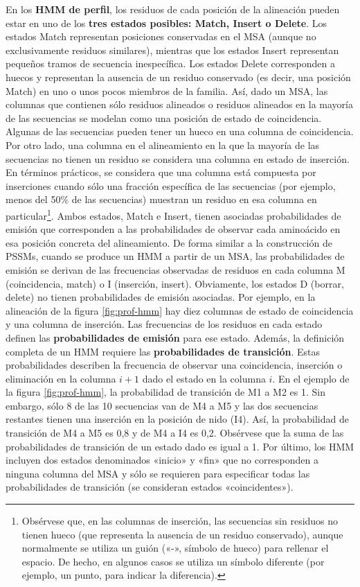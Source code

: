 En los \textbf{HMM de perfil}, los residuos de cada posición de la alineación pueden estar en uno de los \textbf{tres estados posibles: Match, Insert o Delete}. Los estados Match representan posiciones conservadas en el MSA (aunque no exclusivamente residuos similares), mientras que los estados Insert representan pequeños tramos de secuencia inespecífica. Los estados Delete corresponden a huecos y representan la ausencia de un residuo conservado (es decir, una posición Match) en uno o unos pocos miembros de la familia. Así, dado un MSA, las columnas que contienen sólo residuos alineados o residuos alineados en la mayoría de las secuencias se modelan como una posición de estado de coincidencia. Algunas de las secuencias pueden tener un hueco en una columna de coincidencia. Por otro lado, una columna en el alineamiento en la que la mayoría de las secuencias no tienen un residuo se considera una columna en estado de inserción. En términos prácticos, se considera que una columna está compuesta por inserciones cuando sólo una fracción específica de las secuencias (por ejemplo, menos del 50\% de las secuencias) muestran un residuo en esa columna en particular\footnote{Obsérvese que, en las columnas de inserción, las secuencias sin residuos no tienen hueco (que representa la ausencia de un residuo conservado), aunque normalmente se utiliza un guión («-», símbolo de hueco) para rellenar el espacio. De hecho, en algunos casos se utiliza un símbolo diferente (por ejemplo, un punto, para indicar la diferencia).}. Ambos estados, Match e Insert, tienen asociadas probabilidades de emisión que corresponden a las probabilidades de observar cada aminoácido en esa posición concreta del alineamiento. De forma similar a la construcción de PSSMs, cuando se produce un HMM a partir de un MSA, las probabilidades de emisión se derivan de las frecuencias observadas de residuos en cada columna M (coincidencia, match) o I (inserción, insert). Obviamente, los estados D (borrar, delete) no tienen probabilidades de emisión asociadas. Por ejemplo, en la alineación de la figura \ref{fig:prof-hmm} hay diez columnas de estado de coincidencia y una columna de inserción. Las frecuencias de los residuos en cada estado definen las \textbf{probabilidades de emisión} para ese estado. Además, la definición completa de un HMM requiere las \textbf{probabilidades de transición}. Estas probabilidades describen la frecuencia de observar una coincidencia, inserción o eliminación en la columna $i + 1$ dado el estado en la columna $i$. En el ejemplo de la figura \ref{fig:prof-hmm}, la probabilidad de transición de M1 a M2 es 1. Sin embargo, sólo 8 de las 10 secuencias van de M4 a M5 y las dos secuencias restantes tienen una inserción en la posición de nido (I4). Así, la probabilidad de transición de M4 a M5 es 0,8 y de M4 a I4 es 0,2. Obsérvese que la suma de las probabilidades de transición de un estado dado es igual a 1. Por último, los HMM incluyen dos estados denominados «inicio» y «fin» que no corresponden a ninguna columna del MSA y sólo se requieren para especificar todas las probabilidades de transición (se consideran estados «coincidentes»).

